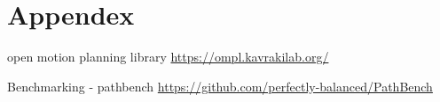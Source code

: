 \documentclass[12pt]{report}
\begin{document}
 

\appendix 

 
\chapter{Appendex}
open motion planning library \href{https://ompl.kavrakilab.org/}{https://ompl.kavrakilab.org/}
 \vspace{2pt}
 
     Benchmarking - pathbench \href{https://github.com/perfectly-balanced/PathBench}{https://github.com/perfectly-balanced/PathBench}
 
 
\end{document}
